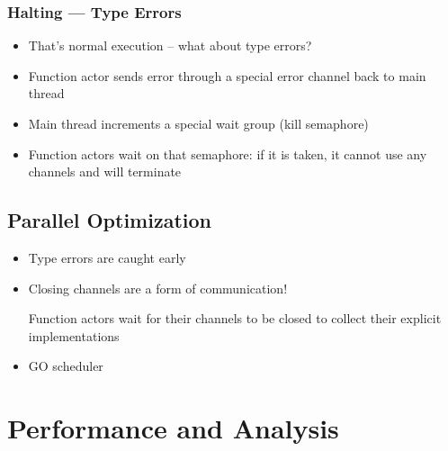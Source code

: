 \documentclass{beamer}
\begin{document}
\begin{frame}
	\frametitle{Halting --- Type Errors}

	\begin{itemize}
		\item That's normal execution -- what about type errors?
		\item Function actor sends error through a special error channel back
			to main thread
		\item Main thread increments a special wait group (kill semaphore)
		\item Function actors wait on that semaphore: if it is taken, it cannot
			use any channels and will terminate
	\end{itemize}
\end{frame}

\subsection{Parallel Optimization}

\begin{frame}
	\begin{itemize}
		\item Type errors are caught early
		\item Closing channels are a form of communication!
		
			Function actors wait for their channels to be closed to
			collect their explicit implementations
		\item GO scheduler
	\end{itemize}
\end{frame}

\section{Performance and Analysis}

\end{document}
